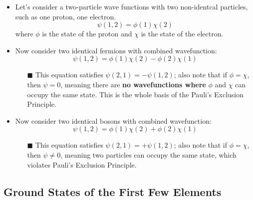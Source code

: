 \documentclass[12pt, letterpaper, twoside]{article}
\begin{document}
\begin{itemize}
    \item Let's consider a two-particle wave functions with two non-identcal particles, such as one proton, one electron.
    \begin{equation*}
        \psi(1,2) = \phi(1)\chi(2)
    \end{equation*}
    where $\phi$ is the state of the proton and $\chi$ is the state of the electron.
    \item Now consider two identical fermions with combined wavefunction:
        \begin{equation*}
            \psi(1,2) = \phi(1)\chi(2) - \phi(2)\chi(1)
        \end{equation*}
    \begin{itemize}
        \item[$\blacksquare$] This equation satisfies $\psi(2,1) = -\psi(1,2)$; also note that if $\phi = \chi$, then $\psi = 0$, meaning there are \textbf{no wavefunctions where} ${\phi}$ and ${\chi}$ can occupy the same state. This is the whole basis of the Pauli's Exclusion Principle.  
    \end{itemize}
    \item Now consider two identical bosons with combined wavefunction:
    \begin{equation*}
        \psi(1,2) = \phi(1)\chi(2) + \phi(2)\chi(1)
    \end{equation*}
    \begin{itemize}
        \item[$\blacksquare$] This equation satisfies $\psi(2,1) = +\psi(1,2)$; also note that if $\phi = \chi$, then $\psi \neq 0$, meaning two particles can occupy the same state, which violates Pauli's Exclusion Principle.  
    \end{itemize}
\end{itemize}

\subsection{Ground States of the First Few Elements}
\end{document}
